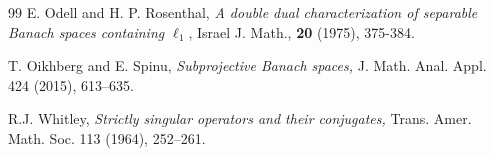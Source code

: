 \documentclass[12pt]{amsart}
\theoremstyle{plain}
\numberwithin{equation}{section}
\begin{document}
\begin{thebibliography}{99}
 E. Odell and H. P. Rosenthal,\emph{ A double dual characterization of separable Banach spaces containing $ \ell_1$}, Israel J. Math., {\bf 20} (1975), 375-384.

 T. Oikhberg and E. Spinu, \emph{Subprojective Banach spaces,} J. Math. Anal. Appl. 424 (2015), 613--635.


 R.J. Whitley, \emph{Strictly singular operators and their conjugates,} Trans. Amer. Math. Soc. 113 (1964), 252--261.

\end{thebibliography}
\end{document}
